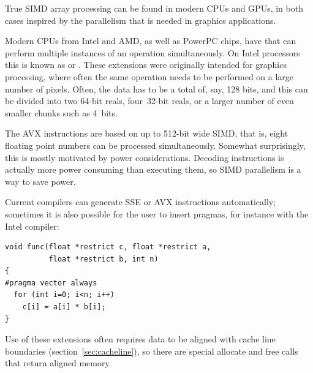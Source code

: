 True SIMD array processing can be found in modern CPUs and GPUs, in
both cases inspired by the parallelism that is needed in graphics
applications.

Modern CPUs from Intel and AMD, as well as
PowerPC chips, have  that can perform
multiple instances of an operation simultaneously. On Intel processors
this is known as  or . These extensions were
originally intended for graphics processing, where often the same
operation needs to be performed on a large number of pixels. Often,
the data has to be a total of, say, 128 bits, and this can be divided
into two 64-bit reals, four~32-bit reals, or a larger number of even
smaller chunks such as 4~bits. 

The \ac{AVX} instructions are based on up to
512-bit wide SIMD, that is, eight floating point numbers can be
processed simultaneously. Somewhat surprisingly, this is mostly
motivated by power considerations. Decoding instructions is actually
more power consuming than executing them, so SIMD parallelism is a way
to save power.

Current compilers can generate \ac{SSE} or \ac{AVX}
instructions automatically;
sometimes it is also possible for the user to insert pragmas, for
instance with the Intel compiler:
\begin{verbatim}
void func(float *restrict c, float *restrict a,
          float *restrict b, int n)
{
#pragma vector always
  for (int i=0; i<n; i++)
    c[i] = a[i] * b[i];
}
\end{verbatim}
Use of these extensions often requires data to be aligned with cache
line boundaries (section~\ref{sec:cacheline}), so there are special
allocate and free calls that return aligned memory.

